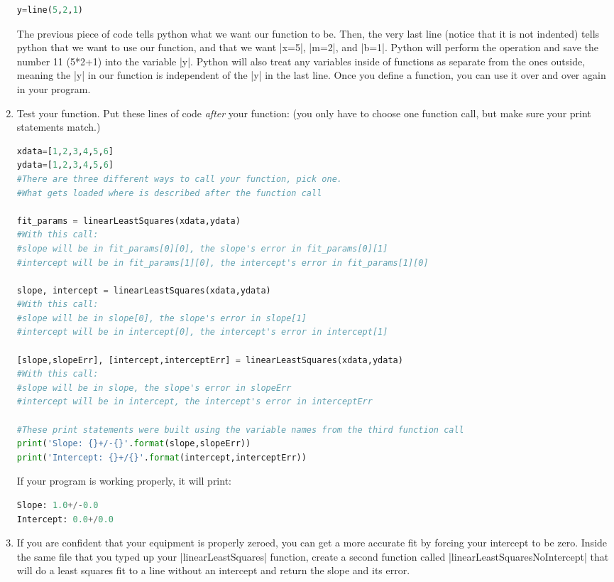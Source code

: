 \documentclass{book}
\begin{document}
\begin{enumerate}
\begin{lstlisting}[language=python]
y=line(5,2,1)
\end{lstlisting}
The previous piece of code tells python what we want our function to be.  Then,  the very last line (notice that it is not indented) tells python that we want to use our function, and that we want |x=5|, |m=2|, and |b=1|.  Python will perform the operation and save the number 11 (5*2+1) into the variable |y|.  Python will also treat any variables inside of functions as separate from the ones outside, meaning the |y| in our function is independent of the |y| in the last line. Once you define a function, you can use it over and over again in your program.

\item Test your function.  Put these lines of code {\em after} your function: (you only have to choose one function call, but make sure your print statements match.)
\begin{lstlisting}[language=python]
xdata=[1,2,3,4,5,6]
ydata=[1,2,3,4,5,6]
#There are three different ways to call your function, pick one.  
#What gets loaded where is described after the function call

fit_params = linearLeastSquares(xdata,ydata)
#With this call:
#slope will be in fit_params[0][0], the slope's error in fit_params[0][1]
#intercept will be in fit_params[1][0], the intercept's error in fit_params[1][0]

slope, intercept = linearLeastSquares(xdata,ydata)
#With this call:
#slope will be in slope[0], the slope's error in slope[1]
#intercept will be in intercept[0], the intercept's error in intercept[1]

[slope,slopeErr], [intercept,interceptErr] = linearLeastSquares(xdata,ydata)
#With this call:
#slope will be in slope, the slope's error in slopeErr
#intercept will be in intercept, the intercept's error in interceptErr

#These print statements were built using the variable names from the third function call
print('Slope: {}+/-{}'.format(slope,slopeErr))
print('Intercept: {}+/{}'.format(intercept,interceptErr))
\end{lstlisting}
If your program is working properly, it will print:
\begin{lstlisting}[language=python]
Slope: 1.0+/-0.0
Intercept: 0.0+/0.0
\end{lstlisting}

\item If you are confident that your equipment is properly zeroed, you can get a more accurate fit by forcing your intercept to be zero.  Inside the same file that you typed up your |linearLeastSquares| function, create a second function called |linearLeastSquaresNoIntercept| that will do a least squares fit to a line without an intercept and return the slope and its error.


\end{enumerate}
\end{document}
